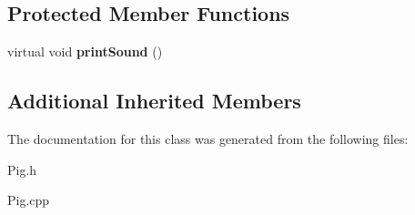 \subsection*{Protected Member Functions}
\begin{DoxyCompactItemize}
\item 
\mbox{\label{class_pig_ab16375db4a149025ea7b2332db7dc519}} 
virtual void {\bfseries print\+Sound} ()
\end{DoxyCompactItemize}
\subsection*{Additional Inherited Members}


The documentation for this class was generated from the following files\+:\begin{DoxyCompactItemize}
\item 
Pig.\+h\item 
Pig.\+cpp\end{DoxyCompactItemize}
